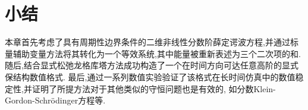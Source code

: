 \section{小结}\label{Section_SAVRRK: 7}
本章首先考虑了具有周期性边界条件的二维非线性分数阶薛定谔波方程,并通过标量辅助变量方法将其转化为一个等效系统,其中能量被重新表述为三个二次项的和.
随后,结合显式松弛龙格库塔方法成功构造了一个在时间方向可达任意高阶的显式保结构数值格式.
最后,通过一系列数值实验验证了该格式在长时间仿真中的数值稳定性,并证明了所提方法对于其他类似的守恒问题也是有效的,
如分数Klein-Gordon-Schr{\"o}dinger方程等.



	


